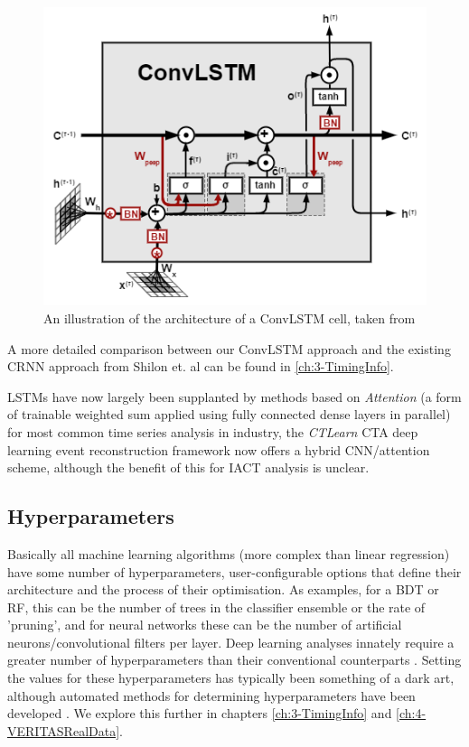 \begin{figure}[ht] 
        \centering \includegraphics[width=0.5\columnwidth]{figures/convlstmcell.png}
        \caption{
                \label{fig:convlstmcell} %
                An illustration of the architecture of a ConvLSTM cell, taken from \cite{convlstmintro}
        }
\end{figure}
A more detailed comparison between our ConvLSTM approach and the existing CRNN approach from Shilon et. al \cite{Shilon} can be found in \ref{ch:3-TimingInfo}.

LSTMs have now largely been supplanted by methods based on \textit{Attention} (a form of trainable weighted sum applied using fully connected dense layers in parallel) for most common time series analysis in industry, the \textit{CTLearn} \cite{tjarkicrc} CTA deep learning event reconstruction framework now offers a hybrid CNN/attention scheme, although the benefit of this for IACT analysis is unclear.

\subsection{Hyperparameters}
Basically all machine learning algorithms (more complex than linear regression) have some number of hyperparameters, user-configurable options that define their architecture and the process of their optimisation. As examples, for a BDT or RF, this can be the number of trees in the classifier ensemble or the rate of 'pruning', and for neural networks these can be the number of artificial neurons/convolutional filters per layer. Deep learning analyses innately require a greater number of hyperparameters than their conventional counterparts \cite{hyperopt}. Setting the values for these hyperparameters has typically been something of a dark art, although automated methods for determining hyperparameters have been developed \cite{hyperopt}. We explore this further in chapters \ref{ch:3-TimingInfo} and \ref{ch:4-VERITASRealData}.

